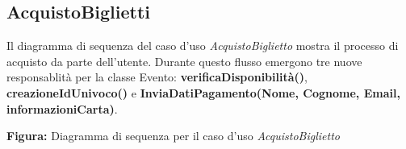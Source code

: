 \newpage
{
\subsection{AcquistoBiglietti}

\begin{center}
Il diagramma di sequenza del caso d’uso \textit{AcquistoBiglietto} mostra il processo di acquisto da parte dell’utente. Durante questo flusso emergono tre nuove responsablità per la classe Evento: \textbf{verificaDisponibilità()}, \textbf{creazioneIdUnivoco()} e \textbf{InviaDatiPagamento(Nome, Cognome, Email, informazioniCarta)}. 
\vspace*{2mm}

\vspace{1ex}
\textbf{Figura:} Diagramma di sequenza per il caso d’uso \textit{AcquistoBiglietto}
\end{center}
}

\vspace{2ex}

